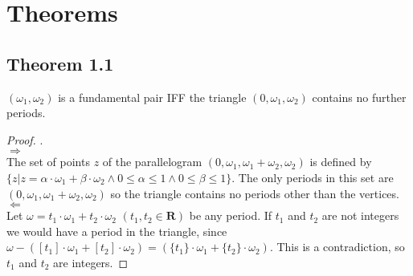 \newpage
\section{Theorems}

\subsection*{Theorem 1.1}

\begin{proposition}
    $(\omega_1, \omega_2)$ is a fundamental pair IFF the triangle $(0, \omega_1, \omega_2)$ contains no further periods.
\end{proposition}

\begin{proof}
    . \\
    $\Rightarrow$ \\
    The set of points $z$ of the parallelogram $(0, \omega_1, \omega_1 + \omega_2, \omega_2)$ is defined by
    $
        \{z | z = \alpha \cdot \omega_1 + \beta \cdot \omega_2 \wedge 0 \leq \alpha \leq 1 \wedge 0 \leq \beta \leq 1 \}.
    $
    The only periods in this set are $(0, \omega_1, \omega_1 + \omega_2, \omega_2)$ so the triangle contains no periods
    other than the vertices. \\
    $\Leftarrow$ \\
    Let $\omega = t_1 \cdot \omega_1 + t_2 \cdot \omega_2$ $(t_1, t_2 \in \mathbf{R})$ be any period.
    If $t_1$ and $t_2$ are not integers we would have a period in the triangle,
    since $\omega - ( [t_1] \cdot \omega_1 + [t_2] \cdot \omega_2 ) = ( \{ t_1 \} \cdot \omega_1 + \{ t_2 \} \cdot \omega_2 )$.
    This is a contradiction, so $t_1$ and $t_2$ are integers.
\end{proof}